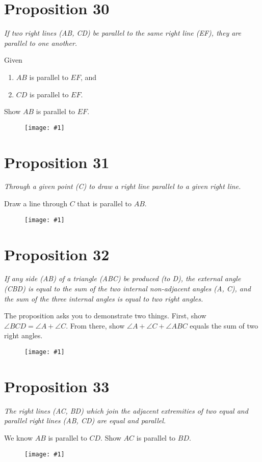 \documentclass[openany]{book}
\newcommand{\diagram}[1]{
    \vspace*{\fill}
    \begin{figure}[H]
        \centering
        \texttt{[image: \#1]}
    \end{figure}
    \vspace*{\fill}
}
\newenvironment{proposition}
    {\begin{center}\em}
    {\end{center}}
\begin{document}
    \clearpage
    \section{Proposition 30}
    \begin{proposition}
    If two right lines (AB, CD) be parallel to the same right line (EF), they are parallel to one another.
    \end{proposition}
    Given
    \begin{enumerate}
    \item $AB$ is parallel to $EF$, and
    \item $CD$ is parallel to $EF$.
    \end{enumerate}
    Show $AB$ is parallel to $EF$.
    \diagram{prop30.pdf}


    \clearpage
    \section{Proposition 31}
    \begin{proposition}
    Through a given point (C) to draw a right line parallel to a given right line.
    \end{proposition}
    Draw a line through $C$ that is parallel to $AB$.
    \diagram{prop31.pdf}


    \clearpage
    \section{Proposition 32}
    \begin{proposition}
    If any side (AB) of a triangle (ABC) be produced (to D), the external angle (CBD) is equal to the sum of the two
    internal non-adjacent angles (A, C), and the sum of the three internal angles is equal to two right angles.
    \end{proposition}
    The proposition asks you to demonstrate two things. First, show $\angle{BCD} = \angle{A} + \angle{C}$. From there, show $\angle{A} + \angle{C} + \angle{ABC}$ equals the sum of two right angles.
    \diagram{prop32.pdf}


    \clearpage
    \section{Proposition 33}
    \begin{proposition}
    The right lines (AC, BD) which join the adjacent extremities of two equal and parallel right lines (AB, CD) are
    equal and parallel.
    \end{proposition}
    We know $AB$ is parallel to $CD$. Show $AC$ is parallel to $BD$.
    \diagram{prop33.pdf}
\end{document}
